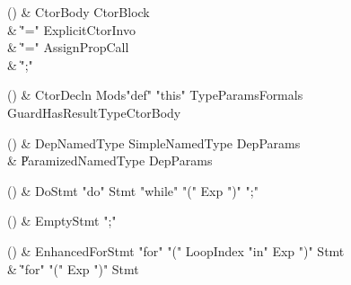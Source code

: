 \begin{bbgrammarappendix}{4.2in}

() & CtorBody \label{prod:CtorBody}  \: CtorBlock \\
 &    \| \xcd"=" ExplicitCtorInvo \\
 &    \| \xcd"=" AssignPropCall \\
 &    \| \xcd";" \\

\end{bbgrammarappendix}

\begin{bbgrammarappendix}{4.1in}

() & CtorDecln \label{prod:CtorDecln}  \: Mods\opt \xcd"def" \xcd"this" TypeParams\opt Formals Guard\opt HasResultType\opt CtorBody  \\


\end{bbgrammarappendix}

\begin{bbgrammarappendix}{3.8in}

() & DepNamedType \label{prod:DepNamedType}  \: SimpleNamedType DepParams  \\

 &    \| ParamizedNamedType DepParams \\

\end{bbgrammarappendix}

\begin{bbgrammarappendix}{4.4in}

() & DoStmt \label{prod:DoStmt}  \: \xcd"do" Stmt \xcd"while" \xcd"(" Exp \xcd")" \xcd";"  \\


\end{bbgrammarappendix}

\begin{bbgrammarappendix}{4.1in}

() & EmptyStmt \label{prod:EmptyStmt}  \: \xcd";"  \\


\end{bbgrammarappendix}

\begin{bbgrammarappendix}{3.5in}

() & EnhancedForStmt \label{prod:EnhancedForStmt}  \: \xcd"for" \xcd"(" LoopIndex \xcd"in" Exp \xcd")" Stmt  \\

 &    \| \xcd"for" \xcd"(" Exp \xcd")" Stmt \\

\end{bbgrammarappendix}

